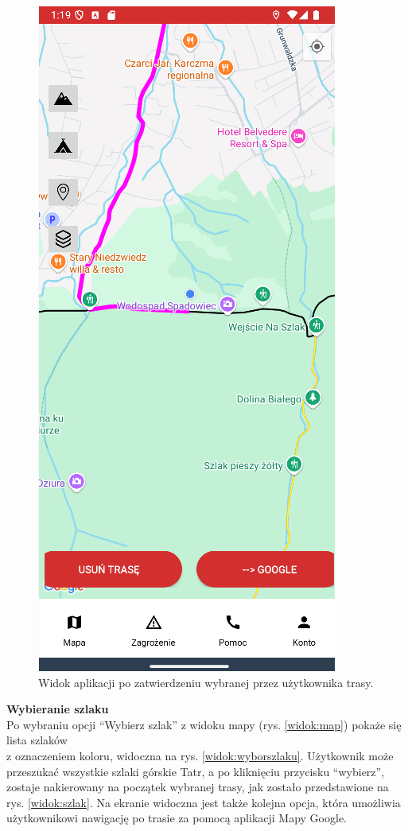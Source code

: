 \begin{figure}[H]
    \centering
    \includegraphics[scale=0.6]{img/imp/widok-trasa.png}
    \caption{Widok aplikacji po zatwierdzeniu wybranej przez użytkownika trasy.}
    \label{widok:zatwierdztrase}
\end{figure}

\noindent
\textbf{Wybieranie szlaku} \\
\indent Po wybraniu opcji “Wybierz szlak” z widoku mapy (rys. \ref{widok:map}) pokaże się lista szlaków \\z oznaczeniem koloru, widoczna na rys. \ref{widok:wyborszlaku}. Użytkownik może przeszukać wszystkie szlaki górskie Tatr, a po kliknięciu przycisku “wybierz”, zostaje nakierowany na początek wybranej trasy, jak zostało przedstawione na rys. \ref{widok:szlak}. Na ekranie widoczna jest także kolejna opcja, która umożliwia użytkownikowi nawigację po trasie za pomocą aplikacji Mapy Google.\\

